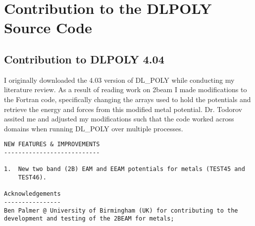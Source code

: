 \chapter{Contribution to the DLPOLY Source Code}
\label{chapter:appendixdlpoly}


\section{Contribution to DLPOLY 4.04}

I originally downloaded the 4.03 version of DL\_POLY while conducting my literature review.  As a result of reading work on \acrshort{2beam} I made modifications to the Fortran code, specifically changing the arrays used to hold the potentials and retrieve the energy and forces from this modified metal potential.  Dr. Todorov assited me and adjusted my modifications such that the code worked across domains when running DL\_POLY over multiple processes.



\begin{lstlisting}[style=sEmail,caption={Add two numbers function}]
NEW FEATURES & IMPROVEMENTS
---------------------------

1.  New two band (2B) EAM and EEAM potentials for metals (TEST45 and
    TEST46). 

Acknowledgements
----------------
Ben Palmer @ University of Birmingham (UK) for contributing to the
development and testing of the 2BEAM for metals; 

\end{lstlisting}




